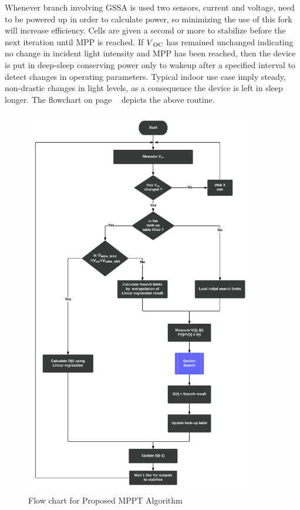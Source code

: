  Whenever branch involving \ac{GSSA} is used two sensors, current and voltage, need to be powered up in order to calculate power, so minimizing the use of this fork will increase efficiency. Cells are given a second or more to stabilize before the next iteration until \ac{MPP} is reached. If $V\textsubscript{OC}$ has remained unchanged indicating no change in incident light intensity and \ac{MPP} has been reached, then the device is put in deep-sleep conserving power only to wakeup after a specified interval to detect changes in operating parameters. Typical indoor use case imply steady, non-drastic changes in light levels, as a consequence the device is left in sleep longer. The flowchart on page ~\pageref{fig:cyflow} depicts the above routine.\\
                    
           
  \begin{figure}[H]
    \begin{center}
	   \includegraphics[width=0.9\textwidth]{images/Proposed_Flow}
	   \caption{ Flow chart for Proposed MPPT Algorithm }
	   \label{fig:cyflow}
    \end{center}
  \end{figure}





